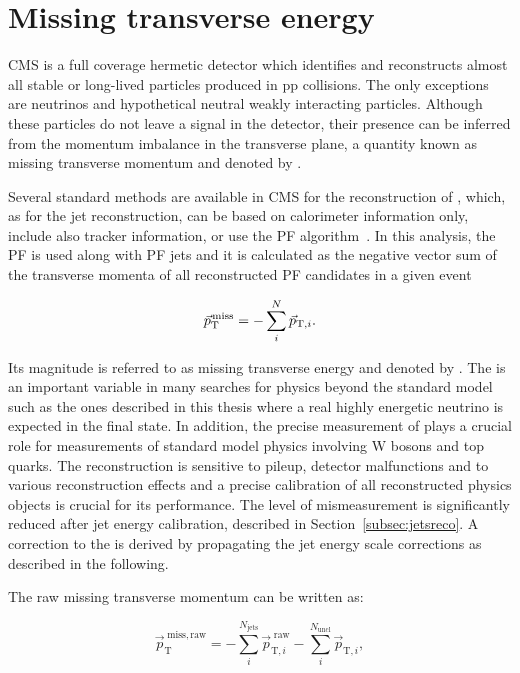 \section{Missing transverse energy}\label{sec:met}

CMS is a full coverage hermetic detector which identifies and reconstructs almost all stable or long-lived particles produced in pp collisions. 
The only exceptions are neutrinos and hypothetical neutral weakly interacting particles.
Although these particles do not leave a signal in the detector, their presence can be inferred from the momentum imbalance in the transverse plane,
a quantity known as missing transverse momentum and denoted by \ptvecmiss.

Several standard methods are available in CMS for the reconstruction of \ptvecmiss, which, as for the jet reconstruction, can be based on calorimeter information only, include also tracker information, or use the PF algorithm~\cite{1748-0221-6-09-P09001}. 
In this analysis, the PF \ptvecmiss is used along with PF jets and it is calculated as the negative vector sum of the transverse momenta of all reconstructed PF candidates in a given event

\begin{equation}
{\vec p}_{\mathrm{T}}^{\kern1pt\text{miss}} = -\sum_{i}^{N}{\vec p}_{\mathrm{T},i}.
\end{equation}

Its magnitude is referred to as missing transverse energy and denoted by \ETmiss.
The \ETmiss is an important variable in many searches for physics beyond the standard model such as the ones described in this thesis where a real highly energetic neutrino is expected in the final state.
In addition, the precise measurement of \ETmiss plays a crucial role for measurements of standard model physics involving W bosons and top quarks.
The \ptvecmiss reconstruction is sensitive to pileup, detector malfunctions and to various reconstruction effects and a precise calibration of all reconstructed physics objects is crucial for its performance.
The level of mismeasurement is significantly reduced after jet energy calibration, described in Section~\ref{subsec:jetsreco}.
A correction to the \ptvecmiss is derived by propagating the jet energy scale corrections as described in the following.

The raw missing transverse momentum can be written as:

\begin{equation}
{\vec p}_\mathrm{T}^\mathrm{\; miss,raw} = - \sum_{i}^{N_\mathrm{jets}} {\vec p}_{\mathrm{T},i}^{\;\mathrm{raw}} - \sum_{i}^{N_\mathrm{uncl}} {\vec p}_{\mathrm{T},i},
\end{equation}

